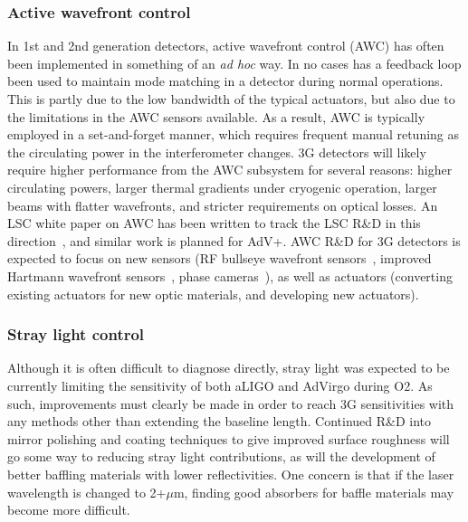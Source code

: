 \subsubsection{Active wavefront control}
In 1st and 2nd generation detectors, active wavefront control (AWC) has often been implemented in something of an \emph{ad hoc} way. In no cases has a feedback loop been used to maintain mode matching in a detector during normal operations. This is partly due to the low bandwidth of the typical actuators, but also due to the limitations in the AWC sensors available. As a result, AWC is typically employed in a set-and-forget manner, which requires frequent manual retuning as the circulating power in the interferometer changes. 3G detectors will likely require higher performance from the AWC subsystem for several reasons: higher circulating powers, larger thermal gradients under cryogenic operation, larger beams with flatter wavefronts, and stricter requirements on optical losses. An LSC white paper on AWC has been written to track the LSC R\&D in this direction~\cite{aLIGO_AWC}, and similar work is planned for AdV+. AWC R\&D for 3G detectors is expected to focus on new sensors (RF bullseye wavefront sensors~\cite{bullseye}, improved Hartmann wavefront sensors~\cite{HWS}, phase cameras~\cite{phasecam}), as well as actuators (converting existing actuators for new optic materials, and developing new actuators). 
 

\subsubsection{Stray light control}
Although it is often difficult to diagnose directly, stray light was expected to be currently limiting the sensitivity of both aLIGO and AdVirgo during O2. As such, improvements must clearly be made in order to reach 3G sensitivities with any methods other than extending the baseline length. Continued R\&D into mirror polishing and coating techniques to give improved surface roughness will go some way to reducing stray light contributions, as will the development of better baffling materials with lower reflectivities. One concern is that if the laser wavelength is changed to 2+$\mu$m, finding good absorbers for baffle materials may become more difficult. 

